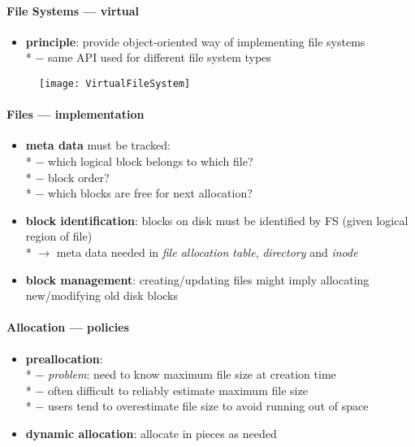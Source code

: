\paragraph{File Systems --- virtual}
\begin{itemize}
  \item \textbf{principle}: provide object-oriented way of implementing file systems \\*
    $ - $ same API used for different file system types
\end{itemize}
\begin{figure}[h]\centering\label{VirtualFileSystem}\texttt{[image: VirtualFileSystem]}\end{figure}

\paragraph{Files --- implementation}
\begin{itemize}
  \item \textbf{meta data} must be tracked: \\*
    $ - $ which logical block belongs to which file? \\*
    $ - $ block order? \\*
    $ - $ which blocks are free for next allocation?
  \item \textbf{block identification}: blocks on disk must be identified by FS (given logical region of file) \\*
    $ \to $ meta data needed in \emph{file allocation table}, \emph{directory} and \emph{inode}
  \item \textbf{block management}: creating/updating files might imply allocating new/modifying old disk blocks
\end{itemize}

\paragraph{Allocation --- policies}
\begin{itemize}
  \item \textbf{preallocation}: \\*
    $ - $ \emph{problem}: need to know maximum file size at creation time \\*
    $ - $ often difficult to reliably estimate maximum file size \\*
    $ - $ users tend to overestimate file size to avoid running out of space
  \item \textbf{dynamic allocation}: allocate in pieces as needed
\end{itemize}

